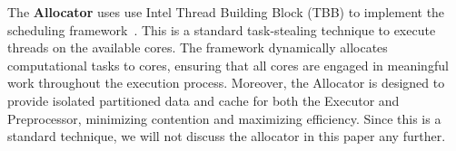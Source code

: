 The \textbf{Allocator} uses use Intel Thread Building Block (TBB) to
implement the scheduling framework~\cite{inteltbb}.  This is a
standard task-stealing technique to execute threads on the available
cores.  The framework dynamically allocates computational tasks to
cores, ensuring that all cores are engaged in meaningful work
throughout the execution process. Moreover, the Allocator is designed
to provide isolated partitioned data and cache for both the Executor
and Preprocessor, minimizing contention and maximizing efficiency.
Since this is a standard technique, we will not discuss the allocator
in this paper any further.

